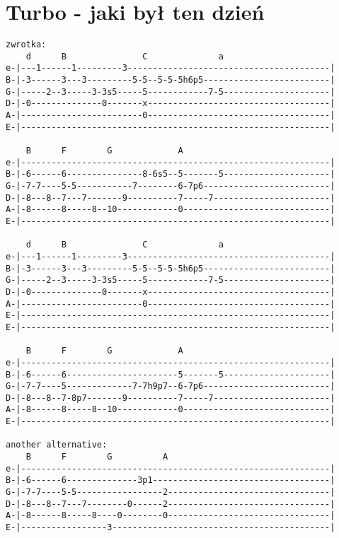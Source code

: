 \section{Turbo - jaki był ten dzień}
\begin{verbatim}
zwrotka:
    d      B               C              a 
e-|---1------1---------3----------------------------------------|
B-|-3------3---3---------5-5--5-5-5h6p5-------------------------|
G-|-----2--3-----3-3s5-----5------------7-5---------------------|
D-|-0--------------0-------x------------------------------------|
A-|------------------------0------------------------------------|
E-|-------------------------------------------------------------|
  
    B      F        G             A
e-|-------------------------------------------------------------|
B-|-6------6---------------8-6s5--5-------5---------------------|
G-|-7-7----5-5-----------7--------6-7p6-------------------------|
D-|-8---8--7---7-------9----------7-----7-----------------------|
A-|-8------8-----8--10------------0-----------------------------|
E-|-------------------------------------------------------------|

    d      B               C              a 
e-|---1------1---------3----------------------------------------|
B-|-3------3---3---------5-5--5-5-5h6p5-------------------------|
G-|-----2--3-----3-3s5-----5------------7-5---------------------|
D-|-0--------------0-------x------------------------------------|
A-|------------------------0------------------------------------|
E-|-------------------------------------------------------------|
E-|-------------------------------------------------------------|

    B      F        G             A
e-|-------------------------------------------------------------|
B-|-6------6----------------------5-------5---------------------|
G-|-7-7----5-------------7-7h9p7--6-7p6-------------------------|
D-|-8---8--7-8p7-------9----------7-----7-----------------------|
A-|-8------8-----8--10------------0-----------------------------|
E-|-------------------------------------------------------------|

another alternative:
    B      F        G          A
e-|-------------------------------------------------------------|
B-|-6------6--------------3p1-----------------------------------|
G-|-7-7----5-5-----------------2--------------------------------|
D-|-8---8--7---7--------0------2--------------------------------|
A-|-8------8-----8----0--------0--------------------------------|
E-|-----------------3-------------------------------------------|


\end{verbatim}
